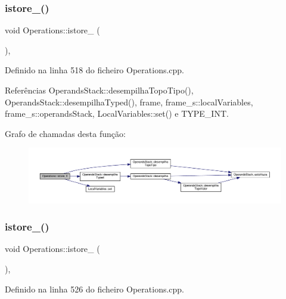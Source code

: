 \subsubsection{\texorpdfstring{istore\+\_()}{istore\_0()}}
{\footnotesize\ttfamily void Operations\+::istore\+\_ (\begin{DoxyParamCaption}{ }\end{DoxyParamCaption})\hspace{0.3cm}{\ttfamily [static]}, {\ttfamily [private]}}



Definido na linha 518 do ficheiro Operations.\+cpp.



Referências Operands\+Stack\+::desempilha\+Topo\+Tipo(), Operands\+Stack\+::desempilha\+Typed(), frame, frame\+\_\+s\+::local\+Variables, frame\+\_\+s\+::operands\+Stack, Local\+Variables\+::set() e T\+Y\+P\+E\+\_\+\+I\+NT.

Grafo de chamadas desta função\+:
\nopagebreak
\begin{figure}[H]
\begin{center}
\leavevmode
\includegraphics[width=350pt]{classOperations_ae0a17c510b570467f5b025e3dcbe1398_cgraph}
\end{center}
\end{figure}
\mbox{\label{classOperations_aeb89677195b16d5c595ec9faaddc2c76}} 
\subsubsection{\texorpdfstring{istore\+\_()}{istore\_1()}}
{\footnotesize\ttfamily void Operations\+::istore\+\_ (\begin{DoxyParamCaption}{ }\end{DoxyParamCaption})\hspace{0.3cm}{\ttfamily [static]}, {\ttfamily [private]}}



Definido na linha 526 do ficheiro Operations.\+cpp.




